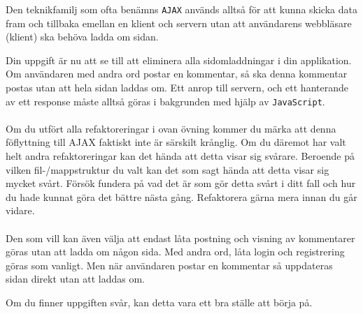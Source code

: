 \documentclass[12pt]{article}
\begin{document}
Den teknikfamilj som ofta benämns \texttt{AJAX} används alltså för att kunna skicka data fram och tillbaka emellan en klient och servern utan att användarens webbläsare (klient) ska behöva ladda om sidan.

Din uppgift är nu att se till att eliminera alla sidomladdningar i din applikation. Om användaren med andra ord postar en kommentar, så ska denna kommentar postas utan att hela sidan laddas om. Ett anrop till servern, och ett hanterande av ett response måste alltså göras i bakgrunden med hjälp av \texttt{JavaScript}.

\paragraph{}
Om du utfört alla refaktoreringar i ovan övning kommer du märka att denna föflyttning till AJAX faktiskt inte är särskilt krånglig. Om du däremot har valt helt andra refaktoreringar kan det hända att detta visar sig svårare. Beroende på vilken fil-/mappstruktur du valt kan det som sagt hända att detta visar sig mycket svårt. Försök fundera på vad det är som gör detta svårt i ditt fall och hur du hade kunnat göra det bättre nästa gång. Refaktorera gärna mera innan du går vidare.

\paragraph{}
Den som vill kan även välja att endast låta postning och visning av kommentarer göras utan att ladda om någon sida. Med andra ord, låta login och registrering göras som vanligt. Men när användaren postar en kommentar så uppdateras sidan direkt utan att laddas om.

Om du finner uppgiften svår, kan detta vara ett bra ställe att börja på.
\end{document}
